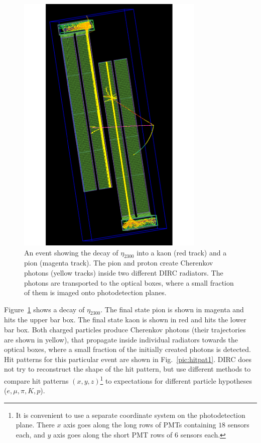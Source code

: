 \documentclass[11pt, a4paper]{article}
\begin{document}
\begin{figure}[!h]
\centering
\includegraphics[angle=270,width=0.8\textwidth]{pics/eta2300decay.pdf}
\caption{\label{pic:eta2300}
An event showing the decay of $\eta_{2300}$ into a kaon (red track) and a pion (magenta track). 
The pion and proton create Cherenkov photons (yellow tracks) inside two different DIRC radiators. The photons are transported to the optical boxes, where a small fraction of them is imaged onto photodetection planes.
}
\end{figure}

Figure~\ref{pic:eta2300} shows a decay of $\eta_{2300}$. The final state pion is shown in magenta and hits the upper bar box. The final state kaon is shown in red and hits the lower bar box. Both charged particles produce Cherenkov photons (their trajectories are shown in yellow), that propagate inside individual radiators towards the optical boxes, where a small fraction of the initially created photons is detected. Hit patterns for this particular event are shown in Fig.~\ref{pic:hitpat1}. DIRC does not try to reconstruct the shape of the hit pattern, but use different methods to compare hit patterns $(x,y,z)$\footnote{It is convenient to use a separate coordinate system on the photodetection plane. There $x$ axis goes along the long rows of PMTs containing $18$ sensors each, and $y$ axis goes along the short PMT rows of $6$ sensors each.} to expectations for different particle hypotheses ($e, \mu, \pi, K, p$).
\end{document}
